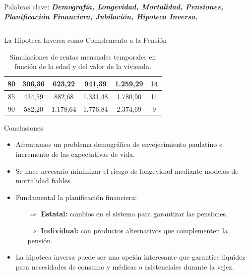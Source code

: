 \documentclass[]{beamer}
\begin{document}
\begin{frame}{\vspace{1ex}\hfill Palabras clave: \bfseries \textit{Demograf\'ia, Longevidad, Mortalidad, Pensiones, Planificaci\'on Financiera, Jubilaci\'on, Hipoteca Inversa.}}
\begin{columns}[t]
\begin{block}{La Hipoteca Inversa como Complemento a la Pensi\'on}
\begin{multicols}{2}
\begin{table}[h]
\begin{tabular}{|c|c|c|c|c|c|}
							 \rowcolor[gray]{0.8}80 & 306,36 & 623,22 & 941,39 & 1.259,29 & 14 \\ \hline
							 85 & 434,59 & 882,68 & 1.331,48 & 1.780,90 & 11 \\ \hline
							 \rowcolor[gray]{0.8}90 & 582,20 & 1.178,64 & 1.776,84 & 2.374,69 & 9 \\ \hline
						\end{tabular}
						\caption{Simulaciones de rentas mensuales temporales en funci\'on de la edad y del valor de la vivienda.}
						\label{renta}
					\end{table}
\vspace{-0.3cm}					
			\end{multicols}
			\vspace{-0.6cm}
			\noindent
			\begin{minipage}{.98\columnwidth}
				\begin{block}{Conclusiones}\vspace{-0.6cm}
					\begin{multicols}{2}
						\setlength{\parindent}{1.2em}	
						\setlength{\parskip}{1ex}
						\begin{itemize}
							\item Afrontamos un problema demogr\'afico de envejecimiento paulatino e incremento de las expectativas de vida.
							\item Se hace necesario minimizar el riesgo de longevidad mediante modelos de mortalidad fiables.
							\item Fundamental la planificaci\'on financiera: 
								\begin{enumerate}
									\item[$\Rightarrow$] \textbf{Estatal:} cambios en el sistema para garantizar las pensiones.
									\item[$\Rightarrow$] \textbf{Individual:} con productos alternativos que complementen la pensi\'on.
								\end{enumerate}
							\item La hipoteca inversa puede ser una opci\'on interesante que garantice liquidez para necesidades de consumo y m\'edicas o asistenciales durante la vejez.
						\end{itemize}
					\end{multicols}
					\vspace{-0.5cm}
				\end{block}
			\end{minipage}
		\end{block}
		\noindent
		

\end{columns}
\end{frame}
\end{document}
